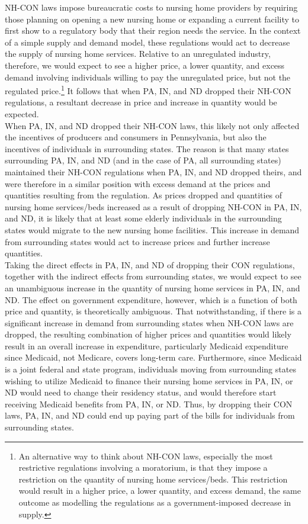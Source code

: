 \documentclass[../Main.tex]{subfiles}
\begin{document}
NH-CON laws impose bureaucratic costs to nursing home providers by requiring those planning on opening a new nursing home or expanding a current facility to first show to a regulatory body that their region needs the service. In the context of a simple supply and demand model, these regulations would act to decrease the supply of nursing home services. Relative to an unregulated industry, therefore, we would expect to see a higher price, a lower quantity, and excess demand involving individuals willing to pay the unregulated price, but not the regulated price.\footnote{An alternative way to think about NH-CON laws, especially the most restrictive regulations involving a moratorium, is that they impose a restriction on the quantity of nursing home services/beds. This restriction would result in a higher price, a lower quantity, and excess demand, the same outcome as modelling the regulations as a government-imposed decrease in supply.} It follows that when PA, IN, and ND dropped their NH-CON regulations, a resultant decrease in price and increase in quantity would be expected.\\ 
\indent When PA, IN, and ND dropped their NH-CON laws, this likely not only affected the incentives of producers and consumers in Pennsylvania, but also the incentives of individuals in surrounding states. The reason is that many states surrounding PA, IN, and ND (and in the case of PA, all surrounding states) maintained their NH-CON regulations when PA, IN, and ND dropped theirs, and were therefore in a similar position with excess demand at the prices and quantities resulting from the regulation. As prices dropped and quantities of nursing home services/beds increased as a result of dropping NH-CON in PA, IN, and ND, it is likely that at least some elderly individuals in the surrounding states would migrate to the new nursing home facilities. This increase in demand from surrounding states would act to increase prices and further increase quantities.\\ 
\indent Taking the direct effects in PA, IN, and ND of dropping their CON regulations, together with the indirect effects from surrounding states, we would expect to see an unambiguous increase in the quantity of nursing home services in PA, IN, and ND. The effect on government expenditure, however, which is a function of both price and quantity, is theoretically ambiguous. That notwithstanding, if there is a significant increase in demand from surrounding states when NH-CON laws are dropped, the resulting combination of higher prices and quantities would likely result in an overall increase in expenditure, particularly Medicaid expenditure since Medicaid, not Medicare, covers long-term care. Furthermore, since Medicaid is a joint federal and state program, individuals moving from surrounding states wishing to utilize Medicaid to finance their nursing home services in PA, IN, or ND would need to change their residency status, and would therefore start receiving Medicaid benefits from PA, IN, or ND. Thus, by dropping their CON laws, PA, IN, and ND could end up paying part of the bills for individuals from surrounding states.\\
\end{document}
